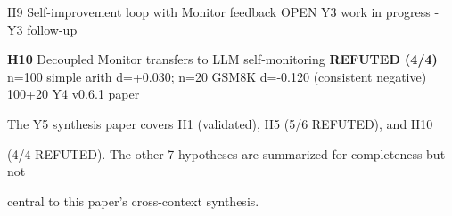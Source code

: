 \documentclass[
]{article}
\begin{document}
H9 \textbar{} Self-improvement loop with Monitor feedback \textbar{}
OPEN \textbar{} Y3 work in progress \textbar{} - \textbar{} Y3 follow-up
\textbar{}

\textbf{H10} \textbar{} Decoupled Monitor transfers to LLM
self-monitoring \textbar{} \textbf{REFUTED (4/4)} \textbar{} n=100
simple arith d=+0.030; n=20 GSM8K d=-0.120 (consistent negative)
\textbar{} 100+20 \textbar{} Y4 v0.6.1 paper \textbar{}

The Y5 synthesis paper covers H1 (validated), H5 (5/6 REFUTED), and H10

(4/4 REFUTED). The other 7 hypotheses are summarized for completeness
but not

central to this paper's cross-context synthesis.
\end{document}
